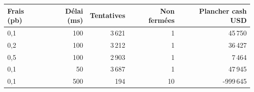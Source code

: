 \begin{tabular}{@{}lrrrr@{}}
\toprule
Frais (pb) & Délai (ms) & Tentatives & Non fermées & Plancher cash USD\\
\midrule
0,1 & 100 & 3\,621 & 1 & 45\,750\\
0,2 & 100 & 3\,212 & 1 & 36\,427\\
0,5 & 100 & 2\,903 & 1 & 7\,464\\
0,1 & 50 & 3\,687 & 1 & 47\,945\\
0,1 & 500 & 194 & 10 & -999\,645\\
\bottomrule
\end{tabular}
